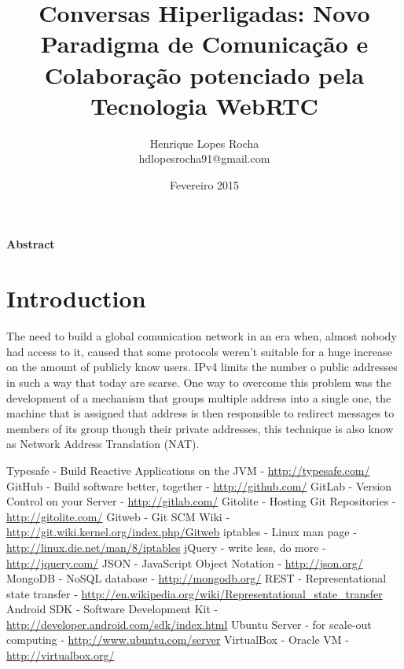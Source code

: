 \documentclass{article}
\title{Conversas Hiperligadas: Novo Paradigma de Comunicação e Colaboração potenciado pela Tecnologia WebRTC}
\author{
	Henrique Lopes Rocha \\ hdlopesrocha91@gmail.com
}
\date{Fevereiro 2015}
\begin{document}
	\maketitle
	\newpage
	\tableofcontents
	\newpage

\textbf{Abstract}
\section{Introduction}
The need to build a global comunication network in an era when, almost nobody had access to it, caused that some protocols weren't suitable for a huge increase on the amount of publicly know users. IPv4 limits the number o public addresses in such a way that today are scarse. One way to overcome this problem was the development of a mechanism that groups multiple address into a single one, the machine that is assigned that address is then responsible to redirect messages to members of its group though their private addresses, this technique is also know as Network Address Translation (NAT).

    
\begin{thebibliography}{9}


 Typesafe - Build Reactive Applications on the JVM - \url{http://typesafe.com/}
 GitHub - Build software better, together - \url{http://github.com/}
 GitLab - Version Control on your Server - \url{http://gitlab.com/}
 Gitolite - Hosting Git Repositories - \url{http://gitolite.com/}
 Gitweb - Git SCM Wiki - \url{http://git.wiki.kernel.org/index.php/Gitweb}
 iptables - Linux man page - \url{http://linux.die.net/man/8/iptables}
 jQuery - write less, do more - \url{http://jquery.com/}
 JSON - JavaScript Object Notation - \url{http://json.org/}
 MongoDB - NoSQL database - \url{http://mongodb.org/}
 REST - Representational state transfer - \url{http://en.wikipedia.org/wiki/Representational_state_transfer}
 Android SDK - Software Development Kit - \url{http://developer.android.com/sdk/index.html}
 Ubuntu Server - for scale-out computing - \url{http://www.ubuntu.com/server}
 VirtualBox - Oracle VM - \url{http://virtualbox.org/}





\end{thebibliography}
\end{document}
